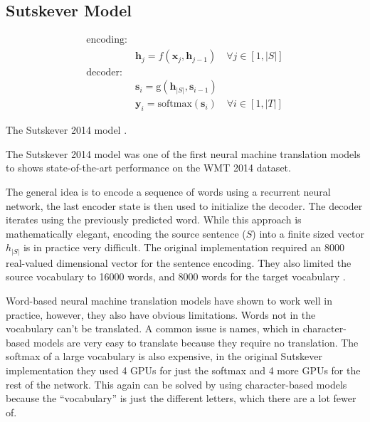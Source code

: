 \subsection{Sutskever Model}

\begin{equationbox}[H]
\begin{equation*}
\begin{aligned}
\text{encoding:} & \\
& \mathbf{h}_j = f(\mathbf{x}_j, \mathbf{h}_{j-1}) \quad \forall j \in [1, |S|] \\
\text{decoder:} & \\
&\mathbf{s}_i = \mathrm{g}(\mathbf{h}_{|S|}, \mathbf{s}_{i-1}) \\
&\mathbf{y}_i = \mathrm{softmax}(\mathbf{s}_i) \quad \forall i \in [1, |T|]
\end{aligned}
\end{equation*}
\caption{The Sutskever 2014 model \cite{sutskever-2014-nmt}.}
\end{equationbox}

The Sutskever 2014 model \cite{sutskever-2014-nmt} was one of the first neural machine translation models to shows state-of-the-art performance on the WMT 2014 dataset.

The general idea is to encode a sequence of words using a recurrent neural network, the last encoder state is then used to initialize the decoder. The decoder iterates using the previously predicted word. While this approach is mathematically elegant, encoding the source sentence ($S$) into a finite sized vector $h_{|S|}$ is in practice very difficult. The original implementation required an 8000 real-valued dimensional vector for the sentence encoding. They also limited the source vocabulary to 16000 words, and 8000 words for the target vocabulary \cite{sutskever-2014-nmt}.

Word-based neural machine translation models have shown to work well in practice, however, they also have obvious limitations. Words not in the vocabulary can't be translated. A common issue is names, which in character-based models are very easy to translate because they require no translation. The softmax of a large vocabulary is also expensive, in the original Sutskever implementation they used 4 GPUs for just the softmax and 4 more GPUs for the rest of the network. This again can be solved by using character-based models because the ``vocabulary'' is just the different letters, which there are a lot fewer of.

